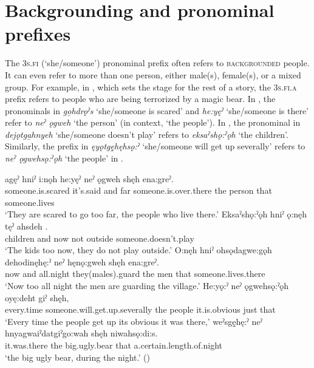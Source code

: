 \section{Backgrounding and pronominal prefixes} \label{ch:Backgrounding and pronominal prefixes}
The \textsc{3s.fi} (‘she/someone’) pronominal prefix often refers to \textsc{backgrounded} people. It can even refer to more than one person, either male(s), female(s), or a mixed group. For example, in , which sets the stage for the rest of a story, the \textsc{3s.fi.a} prefix refers to people who are being terrorized by a magic bear. In , the pronominals in \textit{go̱hdrǫˀs} ‘she/someone is scared’ and \textit{he:yęˀ} ‘she/someone is there’ refer to \textit{neˀ ǫgweh} ‘the person’ (in context, ‘the people’). In , the pronominal in \textit{dejǫtga̱hnyeh} ‘she/someone doesn’t play’ refers to \textit{eksaˀshǫ:ˀǫh} ‘the children’. Similarly, the prefix in \textit{ęyǫtgę̱hęhsǫ:ˀ} ‘she/someone will get up severally’ refers to \textit{neˀ ǫgwehsǫ:ˀǫh} ‘the people’ in . 

\ea\label{ex:indefref2}
\ea\label{ex:indefref2a} 
\gll {} agęˀ hniˀ i:nǫh he:yęˀ neˀ ǫgweh shęh ena:greˀ.\\
someone.is.scared it’s.said and far someone.is.over.there the person that someone.lives\\
\glt ‘They are scared to go too far, the people who live there.’
\ex \label{ex:indefref2b}
\gll Eksaˀshǫ:ˀǫh hniˀ ǫ:nęh tęˀ ahsdeh .\\
children and now not outside someone.doesn’t.play\\
\glt ‘The kids too now, they do not play outside.’
\ex \label{ex:indefref2c}
\gll O:nęh hniˀ ohsǫdagwe:gǫh dehodinęhę:ˀ neˀ hęnǫ:gweh shęh ena:greˀ.\\
now and all.night they(males).guard the men that someone.lives.there\\
\glt ‘Now too all night the men are guarding the village.’
\ex \label{ex:indefref2d}
\gll He:yǫ:ˀ  neˀ ǫgwehsǫ:ˀǫh oyę:deht giˀ shęh,\\
every.time someone.will.get.up.severally the people it.is.obvious just that \\
\glt ‘Every time the people get up its obvious it was there,’
\ex \label{ex:indefref2e}
\gll weˀsgę̱hę:ˀ neˀ hnyagwaiˀdatgiˀgo:wah shęh niwahsǫ:di:s.\\
it.was.there the big.ugly.bear that a.certain.length.of.night\\
\glt ‘the big ugly bear, during the night.’ (\cite{keye_hnyagwaidatgigowah_2012})
\z
\z 

